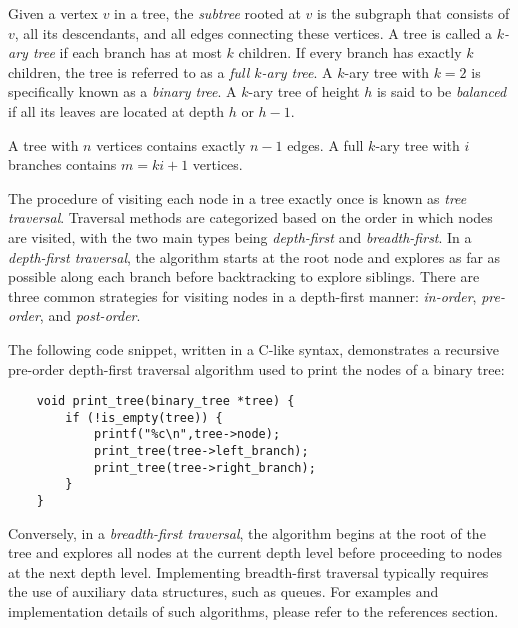 Given a vertex $v$ in a tree, the \emph{subtree} rooted at $v$ is the subgraph that consists of $v$, all its descendants, and all edges connecting these vertices. A tree is called a \emph{$k$-ary tree} if each branch has at most $k$ children. If every branch has exactly $k$ children, the tree is referred to as a \emph{full $k$-ary tree}. A $k$-ary tree with $k = 2$ is specifically known as a \emph{binary tree}. A $k$-ary tree of height $h$ is said to be \emph{balanced} if all its leaves are located at depth $h$ or $h - 1$.

\begin{example}
A tree with $n$ vertices contains exactly $n - 1$ edges. A full $k$-ary tree with $i$ branches contains $m = ki + 1$ vertices.
\end{example}

The procedure of visiting each node in a tree exactly once is known as \emph{tree traversal}. Traversal methods are categorized based on the order in which nodes are visited, with the two main types being \emph{depth-first} and \emph{breadth-first}. In a \emph{depth-first traversal}, the algorithm starts at the root node and explores as far as possible along each branch before backtracking to explore siblings. There are three common strategies for visiting nodes in a depth-first manner: \emph{in-order}, \emph{pre-order}, and \emph{post-order}.

The following code snippet, written in a C-like syntax, demonstrates a recursive pre-order depth-first traversal algorithm used to print the nodes of a binary tree:

\begin{verbatim}
    void print_tree(binary_tree *tree) {
        if (!is_empty(tree)) {
            printf("%c\n",tree->node);
            print_tree(tree->left_branch);
            print_tree(tree->right_branch);
        }
    }
\end{verbatim}

Conversely, in a \emph{breadth-first traversal}, the algorithm begins at the root of the tree and explores all nodes at the current depth level before proceeding to nodes at the next depth level. Implementing breadth-first traversal typically requires the use of auxiliary data structures, such as queues. For examples and implementation details of such algorithms, please refer to the references section.

